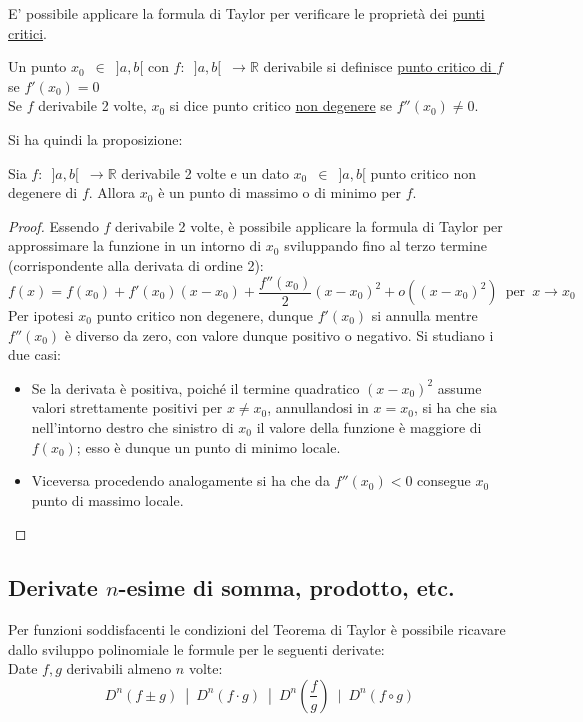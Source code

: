 \documentclass[10pt]{article}
\theoremstyle{plain}
\begin{document}
E' possibile applicare la formula di Taylor per verificare le proprietà dei \hyperlink{critici}{punti critici}.

\begin{defin}
Un punto $x_0 \enspace \in \enspace ]a, b[$ con $f : \enspace ]a, b[ \enspace \rightarrow \mathbb{R}$ derivabile si definisce \underline{punto critico di $f$} se $f'(x_0) = 0$\\
Se $f$ derivabile 2 volte, $x_0$ si dice punto critico \underline{non degenere} se $f''(x_0) \neq 0$.
\end{defin}
Si ha quindi la proposizione:
\begin{prop}
Sia $f : \enspace ]a, b[ \enspace \rightarrow \mathbb{R}$ derivabile 2 volte e un dato $x_0 \enspace \in \enspace ]a, b[$ punto critico non degenere di $f$. Allora $x_0$ è un punto di massimo o di minimo per $f$.
\end{prop}
\begin{proof}
Essendo $f$ derivabile 2 volte, è possibile applicare la formula di Taylor per approssimare la funzione in un intorno di $x_0$ sviluppando fino al terzo termine (corrispondente alla derivata di ordine 2):
\[f(x) = f(x_0) + f'(x_0)(x-x_0) + \frac{f''(x_0)}{2}(x-x_0)^2 + o((x-x_0)^2) \enspace \textrm{per} \enspace x \rightarrow x_0\]
Per ipotesi $x_0$ punto critico non degenere, dunque $f'(x_0)$ si annulla mentre $f''(x_0)$ è diverso da zero, con valore dunque positivo o negativo. Si studiano i due casi:
\begin{itemize}[label=$\star$]
    \item Se la derivata è positiva, poiché il termine quadratico $(x-x_0)^2$ assume valori strettamente positivi per $x \neq x_0$, annullandosi in $x = x_0$, si ha che sia nell'intorno destro che sinistro di $x_0$ il valore della funzione è maggiore di $f(x_0)$; esso è dunque un punto di minimo locale.
    \item Viceversa procedendo analogamente si ha che da $f''(x_0) < 0$ consegue $x_0$ punto di massimo locale.
\end{itemize}
\end{proof}

\subsection{Derivate $n$-esime di somma, prodotto, etc.}
Per funzioni soddisfacenti le condizioni del Teorema di Taylor è possibile ricavare dallo sviluppo polinomiale le formule per le seguenti derivate:\\
Date $f,g$ derivabili almeno $n$ volte:
\[D^n(f \pm g) \enspace | \enspace D^n(f \cdot g) \enspace | \enspace D^n(\frac{f}{g}) \enspace | \enspace D^n(f \circ g)\]
\end{document}
